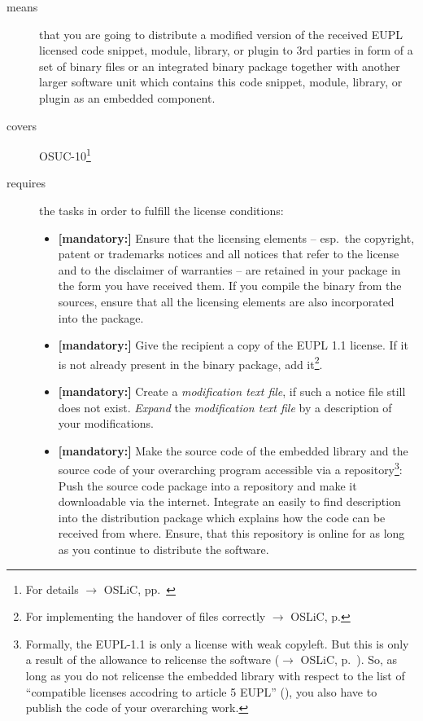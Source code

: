 \begin{description}
\item[means] that you are going to distribute a modified version of the received
EUPL licensed code snippet, module, library, or plugin to 3rd parties in form
of a set of binary files or an integrated binary package together with another
larger software unit which contains this code snippet, module, library, or
plugin as an embedded component.
\item[covers] OSUC-10\footnote{For details $\rightarrow$ OSLiC, pp.\ \pageref{OSUC-10-DEF}}
\item[requires] the tasks in order to fulfill the license conditions:
\begin{itemize}
  
  
  \item \textbf{[mandatory:]} Ensure that the licensing elements -- esp.\ the
  copyright, patent or trademarks notices and all notices that refer to the
  license and to the disclaimer of warranties -- are retained in your package in
  the form you have received them. If you compile the binary from the sources,
  ensure that all the licensing elements are also incorporated into the package.
  
  \item \textbf{[mandatory:]} Give the recipient a copy of the EUPL 1.1
  license. If it is not already present in the binary package, add
  it\footnote{For implementing the handover of files correctly $\rightarrow$
  OSLiC, p. \pageref{DistributingFilesHint}}.
 
  \item \textbf{[mandatory:]} Create a \emph{modification text file}, if such a
  notice file still does not exist. \emph{Expand} the \emph{modification text
  file} by a description of your modifications.
  
  \item \textbf{[mandatory:]} Make the source code of the embedded library and
  the source code of your overarching program accessible via a
  repository\footnote{Formally, the EUPL-1.1 is only a license with weak
  copyleft. But this is only a result of the allowance to relicense the software
  ($\rightarrow$ OSLiC, p.\ \pageref{sec:ProtectingPowerOfEupl}). So, as long as
  you do not relicense the embedded library with respect to the list of
  \enquote{compatible licenses accodring to article 5 EUPL} (\cite[cf.][\nopage
  wp §5 and Appendix]{EuplLicense2007en}), you also have to publish the code of
  your overarching work.}: Push the source code package into a repository and
  make it downloadable via the internet. Integrate an easily to find
  description into the distribution package which explains how the code can
  be received from where. Ensure, that this repository is online for as long as
  you continue to distribute the software.
  

\end{itemize}
\end{description}
